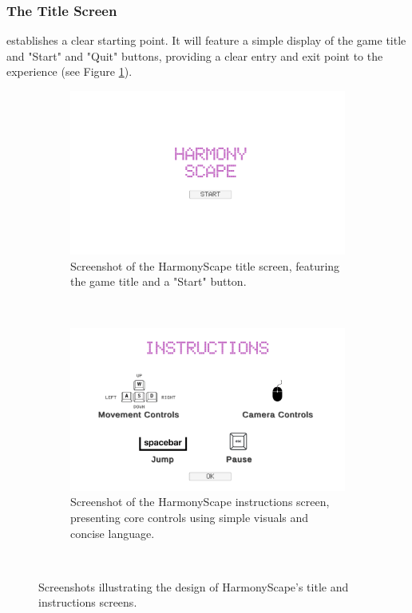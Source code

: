 \documentclass{l4proj}
\begin{document}
\subsubsection{The Title Screen} establishes a clear starting point. It will feature a simple display of the game title and  "Start" and "Quit" buttons, providing a clear entry and exit point to the experience (see Figure \ref{fig:title_screen}).

\begin{figure}[h]
  \centering
  \begin{subfigure}[t]{0.45\textwidth}
    \includegraphics[width=\textwidth]{dissertation/images/title_screen.png}
    \caption{Screenshot of the HarmonyScape title screen, featuring the game title and a "Start" button.}
    \label{fig:title_screen}
  \end{subfigure}
  ~ 
  \begin{subfigure}[t]{0.45\textwidth}
    \includegraphics[width=\textwidth]{dissertation/images/instructions_screen.png} 
    \caption{Screenshot of the HarmonyScape instructions screen, presenting core controls using simple visuals and concise language.}
    \label{fig:instructions_screen}
  \end{subfigure}
  ~  
  \caption{Screenshots illustrating the design of HarmonyScape's title and instructions screens. }
  \label{fig:intro_screens}
\end{figure}
\end{document}
